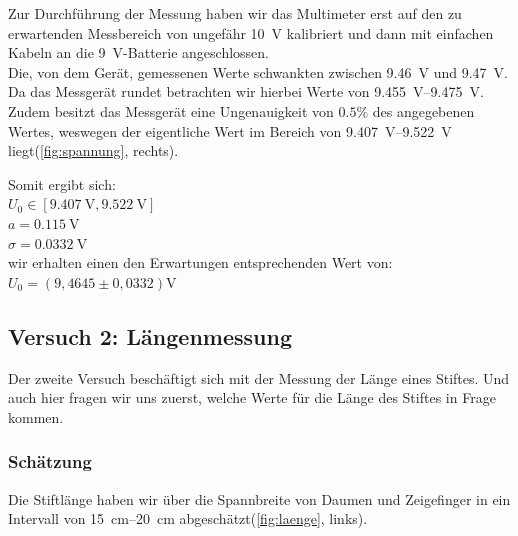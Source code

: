 \documentclass[11pt,a4paper,titlepage, ngerman]{article}
\begin{document}
				Zur Durchführung der Messung haben wir das Multimeter erst auf den zu erwartenden Messbereich von ungefähr \SI{10}{\V} kalibriert und dann mit einfachen Kabeln an die \SI{9}{\V}-Batterie angeschlossen. \\			
				Die, von dem Gerät, gemessenen Werte schwankten zwischen \SI{9,46}{\V} und \SI{9,47}{\V}.
				Da das Messgerät rundet betrachten wir hierbei Werte von \SIrange{9,455}{9,475}{\V}.
				Zudem besitzt das Messgerät eine Ungenauigkeit von $0.5\%$ des angegebenen Wertes, weswegen der eigentliche Wert im Bereich von \SIrange{9,407}{9,522}{\V} liegt(\ref{fig:spannung}, rechts).
			\newpage
				\begin{flushleft}
					Somit ergibt sich:\\
					\vspace{0.5cm}
					$U_0 \in [\SI{9.407}{\V},\SI{9.522}{\V}]$\\
					$a = \SI{0.115}{\V}$ \\
					$\sigma = \SI{0,0332}{\V}$ \\
					\vspace{0.5cm}
					wir erhalten einen den Erwartungen entsprechenden Wert von: \\ 
					\vspace{0.5cm}
					$U_0 = (9,4645 \pm 0,0332)\si{\V}$\\ 
				\end{flushleft}
	
		\vspace{2cm}
		\subsection{Versuch 2: Längenmessung}
			\label{2.2}
			
			Der zweite Versuch beschäftigt sich mit der Messung der Länge eines Stiftes. Und auch hier fragen wir uns zuerst, welche Werte für die Länge des Stiftes in Frage kommen.
		
			\subsubsection{Schätzung}
				\label{2.2.1}
				
				Die Stiftlänge haben wir über die Spannbreite von Daumen und Zeigefinger in ein Intervall von \SIrange{15}{20}{\cm} abgeschätzt(\ref{fig:laenge}, links).
				
\end{document}

